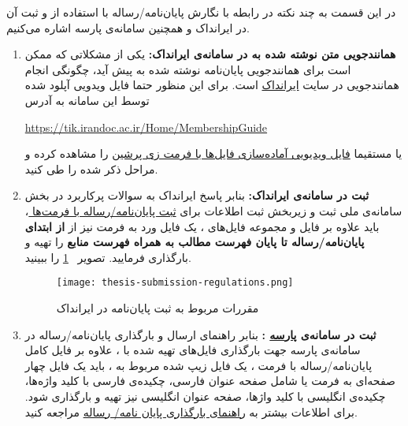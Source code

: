 در این قسمت به چند نکته در رابطه با نگارش پایان‌نامه/رساله با استفاده از \lr{\LaTeX} و ثبت آن در ایرانداک و همچنین سامانه‌ی پارسه اشاره می‌کنیم. ‍‍

{}

\begin{enumerate}
\item \textbf{همانندجویی متن نوشته شده به \lr{\LaTeX}در سامانه‌ی ایرانداک:}
یکی از مشکلاتی که ممکن است برای همانندجویی پایان‌نامه نوشته شده به \lr{\LaTeX} پیش آید، چگونگی انجام همانندجویی در سایت 
\href{https://irandoc.ac.ir/}{ایرانداک}
است. برای این منظور حتما فایل ویدویی آپلود شده توسط این سامانه 
به آدرس 
\begin{latin}
	\noindent
	\url{https://tik.irandoc.ac.ir/Home/MembershipGuide}
\end{latin} 
یا مستقیما 
\href{https://www.aparat.com/v/h0ijS}
{فایل ویدیویی آماده‌‌سازی فایل‌ها با فرمت زی پرشین}
را مشاهده کرده و مراحل ذکر شده را طی کنید. 

\item \textbf{ثبت در سامانه‌ی ایرانداک:}
	بنابر پاسخ ایرانداک به سوالات پرکاربرد در بخش سامانه‌ی ملی ثبت و زیربخش ثبت اطلاعات برای 
\href{https://helpdesk.irandoc.ac.ir/Dana/Kb/68-%D9%BE%D8%A7%DB%8C%D8%A7%D9%86%E2%80%8C%D9%86%D8%A7%D9%85%D9%87-%D9%85%D9%86-%D8%A8%D8%A7-%D9%86%D8%B1%D9%85%E2%80%8C%D8%A7%D9%81%D8%B2%D8%A7%D8%B1-%D9%84%D8%A7%D8%AA%DA%A9%D8%B3-%D9%86%D9%88%D8%B4%D8%AA%D9%87-%D8%B4%D8%AF%D9%87-%D8%A7%D8%B3%D8%AA%D8%8C-%DA%86%D9%87-%DA%A9%D9%86%D9%85%D8%9F}{ثبت پایان‌نامه/رساله با فرمت‌ها \lr{\LaTeX}}،
 باید علاوه بر فایل‌
و مجموعه فایل‌های \lr{\LaTeX}، یک فایل ورد به فرمت 
نیز از 
\textbf{از ابتدای پایان‌نامه/رساله تا پایان فهرست مطالب به همراه فهرست منابع}
را تهیه و بارگذاری فرمایید. تصویر
~\ref{submission-thesis} 
را ببینید. 
\begin{figure}[H]
	\centering
	\texttt{[image: thesis-submission-regulations.png]}
	\caption{مقررات مربوط به ثبت پایان‌نامه در ایرانداک} 
	\label{submission-thesis}
\end{figure}


\item \textbf{ثبت در سامانه‌ی 
\href{https://parseh.modares.ac.ir}{پارسه}
:} 
بنابر راهنمای ارسال و بارگذاری پایان‌نامه/رساله در سامانه‌ی پارسه جهت بارگذاری فایل‌های تهیه شده با 
\lr{\LaTeX}،
علاوه بر فایل کامل پایان‌نامه/رساله  با فرمت 
،
یک فایل زیپ شده مربوط به 
\lr{\LaTeX}،
باید یک فایل 
 چهار صفحه‌ای به فرمت 
یا 
شامل صفحه عنوان فارسی، چکیده‌ی فارسی با کلید واژه‌ها، چکیده‌ی انگلیسی با کلید واژها، صفحه عنوان انگلیسی نیز تهیه و بارگذاری شود. برای اطلاعات بیشتر به 
\linebreak
\href{https://parseh.modares.ac.ir/files/site1/files/guide2.pdf}{راهنمای بارگذاری پایان نامه/ رساله}
مراجعه کنید. 



\end{enumerate}
